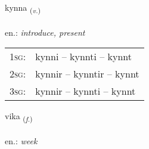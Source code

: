 \documentclass[frontgrid, backgrid]{flacards}\usepackage[]{graphicx}\usepackage[]{xcolor}
\begin{document}
\renewcommand{\flhead}{\vskip5pt \fboxsep=0pt {\small\bfseries\footnotesize Sagnorð | Verb}}
\renewcommand{\fcfoot}{\vskip5pt \fboxsep=0pt \hspace{2pt}{\small\bfseries\footnotesize 1K}}

\renewcommand{\blhead}{\vskip5pt {\small\bfseries\footnotesize Sagnorð | Verb }}
\renewcommand{\bcfoot}{\vskip5pt \hspace{2pt}{\small\bfseries\footnotesize 1K}}


{kynna \small{\textsubscript{(\textit{v.})}} \\[1ex] %
\textphonetic{[cʰɪna]} \\
en.: \emph{introduce, present} \\  [2ex]
\renewcommand*{\arraystretch}{0.8}
\begin{tabular}{p{1cm}l}
\textsc{1sg}: & kynni -- kynnti -- kynnt \\ 
\textsc{2sg}: & kynnir -- kynntir -- kynnt \\ 
\textsc{3sg}: & kynnir -- kynnti -- kynnt \\ 
\end{tabular}
}

\renewcommand{\flhead}{\vskip5pt \fboxsep=0pt {\small\bfseries\footnotesize Nafnorð | Noun}}
\renewcommand{\fcfoot}{\vskip5pt \fboxsep=0pt \hspace{2pt}{\small\bfseries\footnotesize 1K}}

\renewcommand{\blhead}{\vskip5pt {\small\bfseries\footnotesize Nafnorð | Noun }}
\renewcommand{\bcfoot}{\vskip5pt \hspace{2pt}{\small\bfseries\footnotesize 1K}}


{vika \small{\textsubscript{(\textit{f.})}} \\[1ex] %
\textphonetic{[vɪːka]} \\
en.: \emph{week} \\  [2ex]
\renewcommand*{\arraystretch}{0.8}
}
\end{document}
